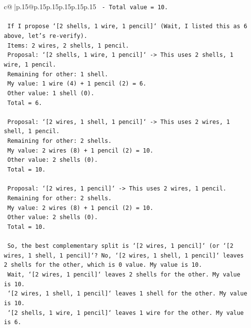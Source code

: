 \documentclass{article}
\begin{document}
{\begin{supertabular}{c@{$\;$}|p{.15\linewidth}@{}p{.15\linewidth}p{.15\linewidth}p{.15\linewidth}p{.15\linewidth}p{.15\linewidth}}
{{{\texttt{    {-}   Total value = 10.} \\
\\ 
\texttt{    If I propose `{[}2 shells, 1 wire, 1 pencil{]}` (Wait, I listed this as 6 above, let's re{-}verify).} \\
\texttt{    Items: 2 wires, 2 shells, 1 pencil.} \\
\texttt{    Proposal: `{[}2 shells, 1 wire, 1 pencil{]}` {-}> This uses 2 shells, 1 wire, 1 pencil.} \\
\texttt{    Remaining for other: 1 shell.} \\
\texttt{    My value: 1 wire (4) + 1 pencil (2) = 6.} \\
\texttt{    Other value: 1 shell (0).} \\
\texttt{    Total = 6.} \\
\\ 
\texttt{    Proposal: `{[}2 wires, 1 shell, 1 pencil{]}` {-}> This uses 2 wires, 1 shell, 1 pencil.} \\
\texttt{    Remaining for other: 2 shells.} \\
\texttt{    My value: 2 wires (8) + 1 pencil (2) = 10.} \\
\texttt{    Other value: 2 shells (0).} \\
\texttt{    Total = 10.} \\
\\ 
\texttt{    Proposal: `{[}2 wires, 1 pencil{]}` {-}> This uses 2 wires, 1 pencil.} \\
\texttt{    Remaining for other: 2 shells.} \\
\texttt{    My value: 2 wires (8) + 1 pencil (2) = 10.} \\
\texttt{    Other value: 2 shells (0).} \\
\texttt{    Total = 10.} \\
\\ 
\texttt{    So, the best complementary split is `{[}2 wires, 1 pencil{]}` (or `{[}2 wires, 1 shell, 1 pencil{]}`? No, `{[}2 wires, 1 shell, 1 pencil{]}` leaves 2 shells for the other, which is 0 value. My value is 10.} \\
\texttt{    Wait, `{[}2 wires, 1 pencil{]}` leaves 2 shells for the other. My value is 10.} \\
\texttt{    `{[}2 wires, 1 shell, 1 pencil{]}` leaves 1 shell for the other. My value is 10.} \\
\texttt{    `{[}2 shells, 1 wire, 1 pencil{]}` leaves 1 wire for the other. My value is 6.} \\
\\ 
}}}
\end{supertabular}}
\end{document}

